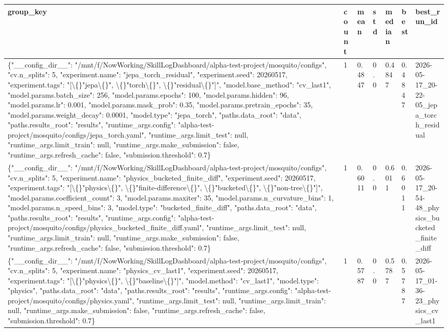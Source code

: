 \begin{tabular}{lllllll}
group\_key & count & mean & std & median & best & best\_run\_id \\
\hline
\{"\_\_config\_dir\_\_": "/mnt/f/NowWorking/SkillLogDashboard/alpha-test-project/mosquito/configs", "cv.n\_splits": 5, "experiment.name": "jepa\_torch\_residual", "experiment.seed": 20260517, "experiment.tags": "[\textbackslash\{\}"jepa\textbackslash\{\}", \textbackslash\{\}"torch\textbackslash\{\}", \textbackslash\{\}"residual\textbackslash\{\}"]", "model.base\_method": "cv\_last1", "model.params.batch\_size": 256, "model.params.epochs": 100, "model.params.hidden": 96, "model.params.lr": 0.001, "model.params.mask\_prob": 0.35, "model.params.pretrain\_epochs": 35, "model.params.weight\_decay": 0.0001, "model.type": "jepa\_torch", "paths.data\_root": "data", "paths.results\_root": "results", "runtime\_args.config": "alpha-test-project/mosquito/configs/jepa\_torch.yaml", "runtime\_args.limit\_test": null, "runtime\_args.limit\_train": null, "runtime\_args.make\_submission": false, "runtime\_args.refresh\_cache": false, "submission.threshold": 0.7\} & 1 & 0.4847 & 0.0 & 0.4847 & 0.4847 & 2026-05-17\_20-22-05\_jepa\_torch\_residual \\
\{"\_\_config\_dir\_\_": "/mnt/f/NowWorking/SkillLogDashboard/alpha-test-project/mosquito/configs", "cv.n\_splits": 5, "experiment.name": "physics\_bucketed\_finite\_diff", "experiment.seed": 20260517, "experiment.tags": "[\textbackslash\{\}"physics\textbackslash\{\}", \textbackslash\{\}"finite-difference\textbackslash\{\}", \textbackslash\{\}"bucketed\textbackslash\{\}", \textbackslash\{\}"non-tree\textbackslash\{\}"]", "model.params.coefficient\_count": 3, "model.params.maxiter": 35, "model.params.n\_curvature\_bins": 1, "model.params.n\_speed\_bins": 3, "model.type": "bucketed\_finite\_diff", "paths.data\_root": "data", "paths.results\_root": "results", "runtime\_args.config": "alpha-test-project/mosquito/configs/physics\_bucketed\_finite\_diff.yaml", "runtime\_args.limit\_test": null, "runtime\_args.limit\_train": null, "runtime\_args.make\_submission": false, "runtime\_args.refresh\_cache": false, "submission.threshold": 0.7\} & 1 & 0.6011 & 0.0 & 0.6011 & 0.6011 & 2026-05-17\_20-54-48\_physics\_bucketed\_finite\_diff \\
\{"\_\_config\_dir\_\_": "/mnt/f/NowWorking/SkillLogDashboard/alpha-test-project/mosquito/configs", "cv.n\_splits": 5, "experiment.name": "physics\_cv\_last1", "experiment.seed": 20260517, "experiment.tags": "[\textbackslash\{\}"physics\textbackslash\{\}", \textbackslash\{\}"baseline\textbackslash\{\}"]", "model.method": "cv\_last1", "model.type": "physics", "paths.data\_root": "data", "paths.results\_root": "results", "runtime\_args.config": "alpha-test-project/mosquito/configs/physics.yaml", "runtime\_args.limit\_test": null, "runtime\_args.limit\_train": null, "runtime\_args.make\_submission": false, "runtime\_args.refresh\_cache": false, "submission.threshold": 0.7\} & 1 & 0.5787 & 0.0 & 0.5787 & 0.5787 & 2026-05-17\_01-36-23\_physics\_cv\_last1 \\

\end{tabular}
